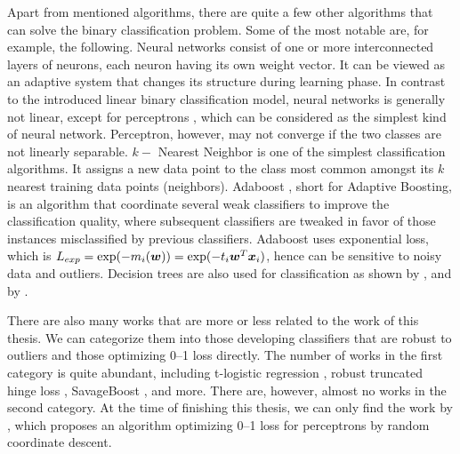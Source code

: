 Apart from mentioned algorithms, there are quite a few other
algorithms that can solve the binary classification problem. Some of
the most notable are, for example, the following. Neural networks
\cite{bishop2} consist of one or more interconnected layers of
neurons, each neuron having its own weight vector. It can be viewed as
an adaptive system that changes its structure during learning
phase. In contrast to the introduced linear binary classification
model, neural networks is generally not linear, except for perceptrons
\cite{perceptron}, which can be considered as the simplest kind of
neural network. Perceptron, however, may not converge if the two
classes are not linearly separable. $k-$ Nearest Neighbor \cite{kNN}
is one of the simplest classification algorithms. It assigns a new
data point to the class most common amongst its $k$ nearest training
data points (neighbors). Adaboost \cite{adaboost}, short for Adaptive
Boosting, is an algorithm that coordinate several weak classifiers to
improve the classification quality, where subsequent classifiers are
tweaked in favor of those instances misclassified by previous
classifiers. Adaboost uses exponential loss, which is $L_{exp} =
\exp(-m_i(\boldsymbol{w})) = \exp(-t_i\boldsymbol{w}^T\boldsymbol{x}_i)$, hence can be sensitive to noisy
data and outliers. Decision trees are also used for classification as
shown by \cite{tree1}, and by \cite{tree2}.

There are also many works that are more or less related to the work of
this thesis. We can categorize them into those developing classifiers
that are robust to outliers and those optimizing 0--1 loss
directly. The number of works in the first category is quite abundant,
including t-logistic regression \cite{Ding}, robust truncated hinge
loss \cite{robusthinge}, SavageBoost \cite{lossdesign}, and
more. There are, however, almost no works in the second category. At
the time of finishing this thesis, we can only find the work by
\cite{ling}, which proposes an algorithm optimizing 0--1 loss for
perceptrons by random coordinate descent.

\ENDMYCOMMENT
